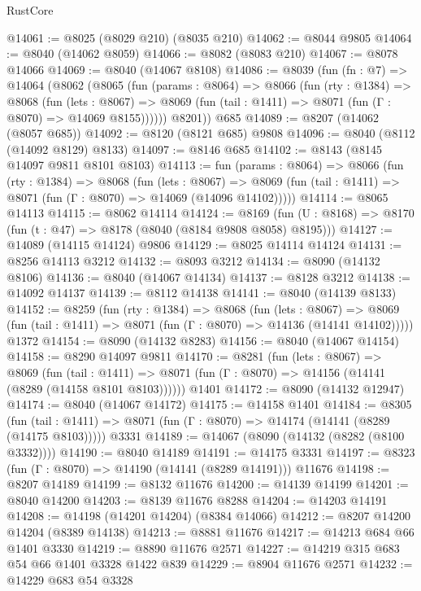 \begin{lexlean}{RustCore}
\begin{coremodule}
@14061 := @8025 (@8029 @210) (@8035 @210)
@14062 := @8044 @9805
@14064 := @8040 (@14062 @8059)
@14066 := @8082 (@8083 @210)
@14067 := @8078 @14066
@14069 := @8040 (@14067 @8108)
@14086 := @8039
    (fun (fn : @7) =>
    @14064
      (@8062
        (@8065
          (fun (params : @8064) =>
          @8066
            (fun (rty : @1384) =>
            @8068
              (fun (lets : @8067) =>
              @8069 (fun (tail : @1411) => @8071 (fun (Γ : @8070) => @14069 @8155))))))
        @8201))
    @685
@14089 := @8207 (@14062 (@8057 @685))
@14092 := @8120 (@8121 @685) @9808
@14096 := @8040 (@8112 (@14092 @8129) @8133)
@14097 := @8146 @685
@14102 := @8143 (@8145 @14097 @9811 @8101 @8103)
@14113 := fun (params : @8064) =>
  @8066
    (fun (rty : @1384) =>
    @8068
      (fun (lets : @8067) =>
      @8069 (fun (tail : @1411) => @8071 (fun (Γ : @8070) => @14069 (@14096 @14102)))))
@14114 := @8065 @14113
@14115 := @8062 @14114
@14124 := @8169
    (fun (U : @8168) => @8170 (fun (t : @47) => @8178 (@8040 (@8184 @9808 @8058) @8195)))
@14127 := @14089 (@14115 @14124) @9806
@14129 := @8025 @14114 @14124
@14131 := @8256 @14113 @3212
@14132 := @8093 @3212
@14134 := @8090 (@14132 @8106)
@14136 := @8040 (@14067 @14134)
@14137 := @8128 @3212
@14138 := @14092 @14137
@14139 := @8112 @14138
@14141 := @8040 (@14139 @8133)
@14152 := @8259
    (fun (rty : @1384) =>
    @8068
      (fun (lets : @8067) =>
      @8069 (fun (tail : @1411) => @8071 (fun (Γ : @8070) => @14136 (@14141 @14102)))))
    @1372
@14154 := @8090 (@14132 @8283)
@14156 := @8040 (@14067 @14154)
@14158 := @8290 @14097 @9811
@14170 := @8281
    (fun (lets : @8067) =>
    @8069
      (fun (tail : @1411) =>
      @8071 (fun (Γ : @8070) => @14156 (@14141 (@8289 (@14158 @8101 @8103))))))
    @1401
@14172 := @8090 (@14132 @12947)
@14174 := @8040 (@14067 @14172)
@14175 := @14158 @1401
@14184 := @8305
    (fun (tail : @1411) => @8071 (fun (Γ : @8070) => @14174 (@14141 (@8289 (@14175 @8103)))))
    @3331
@14189 := @14067 (@8090 (@14132 (@8282 (@8100 @3332))))
@14190 := @8040 @14189
@14191 := @14175 @3331
@14197 := @8323 (fun (Γ : @8070) => @14190 (@14141 (@8289 @14191))) @11676
@14198 := @8207 @14189
@14199 := @8132 @11676
@14200 := @14139 @14199
@14201 := @8040 @14200
@14203 := @8139 @11676 @8288
@14204 := @14203 @14191
@14208 := @14198 (@14201 @14204) (@8384 @14066)
@14212 := @8207 @14200 @14204 (@8389 @14138)
@14213 := @8881 @11676
@14217 := @14213 @684 @66 @1401 @3330
@14219 := @8890 @11676 @2571
@14227 := @14219 @315 @683 @54 @66 @1401 @3328 @1422 @839
@14229 := @8904 @11676 @2571
@14232 := @14229 @683 @54 @3328

\end{coremodule}
\end{lexlean}
